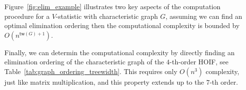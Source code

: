 \documentclass[letterpaper,11pt]{article}
\newcommand{\treewidthp}[1]{\mathsf{tw}(#1)}
\begin{document}
\begin{figure}[ht]
\begin{tikzpicture}
\end{tikzpicture}
\end{figure}

Figure~\ref{fig:elim_example} illustrates two key aspects of the computation procedure for a $V$-statistic with characteristic graph $G$, assuming we can find an optimal elimination ordering then the computational complexity is bounded by $O ( n^{\treewidthp{G} + 1})$.


Finally, we can determin the computational complexity by directly finding an elimination ordering of the characteristic graph of the $4$-th-order HOIF, see Table~\ref{tab:graph_ordering_treewidth}. This requires only $O(n^3)$ complexity, just like matrix multiplication, and this property extends up to the $7$-th order.
\end{document}
